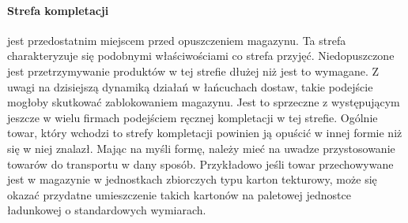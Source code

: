 		\paragraph{Strefa kompletacji} jest przedostatnim miejscem przed opuszczeniem magazynu. Ta strefa charakteryzuje się
		podobnymi właściwościami co strefa przyjęć. Niedopuszczone jest prze\-trzymywanie produktów w tej strefie dłużej niż jest 
		to wymagane. Z uwagi na dzisiejszą dynamiką działań w łańcuchach dostaw, takie podejście mogłoby skutkować zablokowaniem
		magazynu. Jest to sprzeczne z występującym jeszcze w wielu firmach podejściem ręcznej kompletacji w tej strefie. Ogólnie
		towar, który wchodzi to strefy kompletacji powinien ją opuścić w innej formie niż się w niej znalazł. Mając na myśli formę,
		należy mieć na uwadze przystosowanie towarów do transportu w dany sposób. Przykładowo jeśli towar przechowywane jest w magazynie
		w jednostkach zbiorczych typu karton tekturowy, może się okazać przydatne umieszczenie takich kartonów na paletowej 
		jednostce ładunkowej o standardowych wymiarach. 
